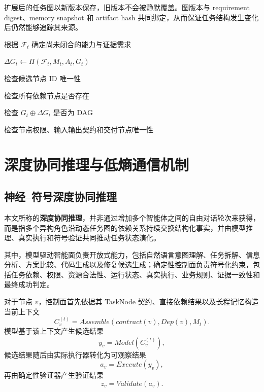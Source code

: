 \documentclass[UTF8,a4paper,12pt,oneside]{ctexbook}
\begin{document}
扩展后的任务图以新版本保存，旧版本不会被静默覆盖。图版本与 requirement digest、memory snapshot 和 artifact hash 共同绑定，从而保证任务结构发生变化后仍然能够追踪其来源。

\begin{algorithm}[H]
\caption{版本化任务图的增量扩展}
\label{alg:incremental-graph-expansion}


根据 $\mathcal{F}_t$ 确定尚未闭合的能力与证据需求\;

$\Delta G_t \leftarrow \Pi(\mathcal{F}_t,M_t,A_t,G_t)$\;

检查候选节点 ID 唯一性\;

检查所有依赖节点是否存在\;

检查 $G_t\oplus\Delta G_t$ 是否为 DAG\;

检查节点权限、输入输出契约和交付节点唯一性\;


\;

\end{algorithm}


\section{深度协同推理与低熵通信机制}

\subsection{神经--符号深度协同推理}

本文所称的\textbf{深度协同推理}，并非通过增加多个智能体之间的自由对话轮次来获得，而是指多个异构角色沿动态任务图的依赖关系持续交换结构化事实，并由模型推理、真实执行和符号验证共同推动任务状态演化。

其中，模型驱动智能面负责开放式能力，包括自然语言意图理解、任务拆解、信息分析、方案比较、代码生成以及修复候选生成；确定性控制面负责符号化约束，包括任务依赖、权限、资源合法性、运行状态、真实执行、业务规则、证据一致性和最终成功判定。

对于节点 $v$，控制面首先依据其 TaskNode 契约、直接依赖结果以及长程记忆构造当前上下文
\[
C_v^{(t)}
=
Assemble
\left(
contract(v),
Dep(v),
M_t
\right).
\]
模型基于该上下文产生候选结果
\[
y_v=
Model
\left(
C_v^{(t)}
\right),
\]
候选结果随后由实际执行器转化为可观察结果
\[
a_v=
Execute(y_v),
\]
再由确定性验证器产生验证结果
\[
z_v=
Validate(a_v).
\]
\end{document}
